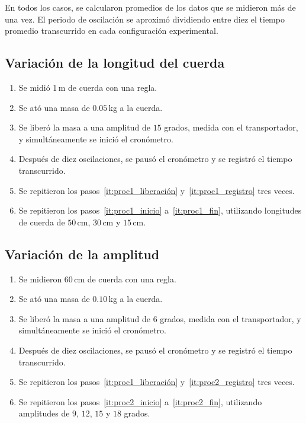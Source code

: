 \documentclass[twocolumn]{report}
\numberwithin{table}{section}
\begin{document}
En todos los casos, se calcularon promedios de los datos que se
midieron más de una vez. El periodo de oscilación se aproximó
dividiendo entre diez el tiempo promedio transcurrido en cada configuración
experimental.

\subsection{Variación de la longitud del cuerda}

\begin{enumerate}
  \item Se midió 1\,m de cuerda con una regla.\label{it:proc1_inicio}
  \item Se ató una masa de $0.05$\,kg a la cuerda.
  \item Se liberó la masa a una amplitud de $15$ grados, medida con
    el transportador, y simultáneamente se inició el
    cronómetro.\label{it:proc1_liberación}
  \item Después de diez oscilaciones, se pausó el cronómetro y se
    registró el tiempo transcurrido.\label{it:proc1_registro}
  \item Se repitieron los pasos~\ref{it:proc1_liberación}
    y~\ref{it:proc1_registro} tres veces.\label{it:proc1_fin}
  \item Se repitieron los pasos~\ref{it:proc1_inicio}
    a~\ref{it:proc1_fin}, utilizando longitudes de cuerda de
    $50$\,cm, $30$\,cm y $15$\,cm.
\end{enumerate}

\subsection{Variación de la amplitud}

\begin{enumerate}
  \item Se midieron 60\,cm de cuerda con una regla.\label{it:proc2_inicio}
  \item Se ató una masa de $0.10$\,kg a la cuerda.
  \item Se liberó la masa a una amplitud de $6$ grados, medida con
    el transportador, y simultáneamente se inició el
    cronómetro.
  \item Después de diez oscilaciones, se pausó el cronómetro y se
    registró el tiempo transcurrido.\label{it:proc2_registro}
  \item Se repitieron los pasos~\ref{it:proc1_liberación}
    y~\ref{it:proc2_registro} tres veces.\label{it:proc2_fin}
  \item Se repitieron los pasos~\ref{it:proc2_inicio}
    a~\ref{it:proc2_fin}, utilizando amplitudes de
    $9$, $12$, $15$ y $18$ grados.
\end{enumerate}
\end{document}
